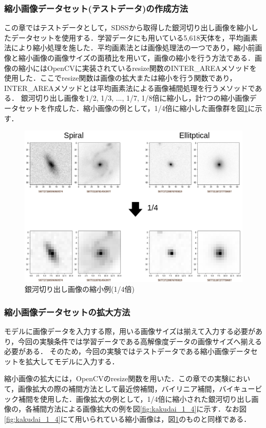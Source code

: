 \documentclass[a4j, 11pt]{jreport}
\begin{document}
\subsubsection{縮小画像データセット(テストデータ)の作成方法}
この章ではテストデータとして，SDSSから取得した銀河切り出し画像を縮小したデータセットを使用する．学習データにも用いている5,618天体を，平均画素法により縮小処理を施した．平均画素法とは画像処理法の一つであり，縮小前画像と縮小画像の画像サイズの面積比を用いて，画像の縮小を行う方法である．画像の縮小にはOpenCVに実装されているresize関数のINTER\_AREAメソッドを使用した．ここでresize関数は画像の拡大または縮小を行う関数であり，INTER\_AREAメソッドとは平均画素法による画像補間処理を行うメソッドである．
銀河切り出し画像を1/2, 1/3, ..., 1/7, 1/8倍に縮小し，計7つの縮小画像データセットを作成した．縮小画像の例として，1/4倍に縮小した画像群を図\ref{fig:shrink_1_4}に示す．

\begin{figure}[H]
 \centering
 \includegraphics[width=13cm]{images/5syou/syuron_5syou_kakudai/ver1/5syou_shrink_ver1.png}
 \caption{銀河切り出し画像の縮小例(1/4倍)}
 \label{fig:shrink_1_4}
\end{figure}

\subsubsection{縮小画像データセットの拡大方法}
モデルに画像データを入力する際，用いる画像サイズは揃えて入力する必要があり，今回の実験条件では学習データである高解像度データの画像サイズへ揃える必要がある．
そのため，今回の実験ではテストデータである縮小画像データセットを拡大してモデルに入力する．

縮小画像の拡大には，OpenCVのresize関数を用いた．この章での実験において，画像拡大の際の補間方法として最近傍補間，バイリニア補間，バイキュービック補間を使用した．画像拡大の例として，1/4倍に縮小された銀河切り出し画像の，各補間方法による画像拡大の例を図\ref{fig:kakudai_1_4}に示す．なお図\ref{fig:kakudai_1_4}にて用いられている縮小画像は，図\ref{fig:shrink_1_4}のものと同様である．
\end{document}

